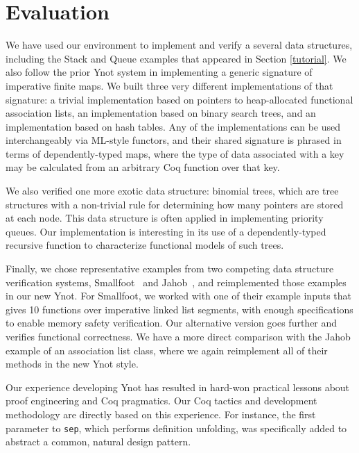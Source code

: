 \documentclass[preprint,nocopyrightspace]{sigplanconf}
\begin{document}

\section{Evaluation}

We have used our environment to implement and verify a several data
structures, including the Stack and Queue examples that appeared in
Section \ref{tutorial}.  We also follow the prior Ynot system in
implementing a generic signature of imperative finite maps.  We built
three very different implementations of that signature: a trivial
implementation based on pointers to heap-allocated functional
association lists, an implementation based on binary search trees, and
an implementation based on hash tables.  Any of the implementations
can be used interchangeably via ML-style functors, and their shared
signature is phrased in terms of dependently-typed maps, where the
type of data associated with a key may be calculated from an arbitrary
Coq function over that key.

We also verified one more exotic data structure: binomial trees, which
are tree structures with a non-trivial rule for determining how many
pointers are stored at each node.  This data structure is often
applied in implementing priority queues.  Our implementation is
interesting in its use of a dependently-typed recursive function to
characterize functional models of such trees.

Finally, we chose representative examples from two competing data
structure verification systems, Smallfoot~\cite{smallfoot} and
Jahob~\cite{jahob}, and reimplemented those examples in our new Ynot.
For Smallfoot, we worked with one of their example inputs that gives
10 functions over imperative linked list segments, with enough
specifications to enable memory safety verification.  Our alternative
version goes further and verifies functional correctness.  We have a
more direct comparison with the Jahob example of an association list
class, where we again reimplement all of their methods in the new Ynot
style.

Our experience developing Ynot has resulted in hard-won practical
lessons about proof engineering and Coq pragmatics.  Our Coq tactics
and development methodology are directly based on this experience.
For instance, the first parameter to {\tt sep}, which performs
definition unfolding, was specifically added to abstract a common,
natural design pattern.
\end{document}
